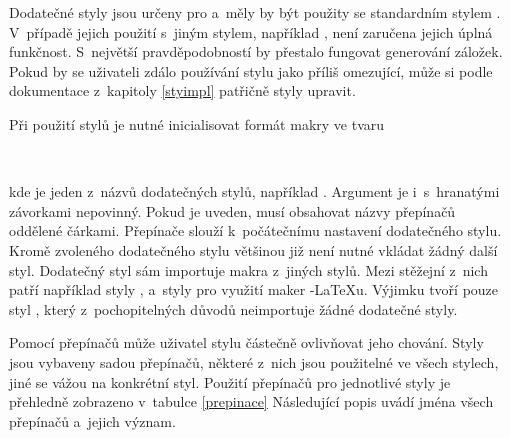 \documentclass[12pt]{article}
\begin{document}
Dodatečné styly jsou určeny pro \LaTeXE{} a~měly by být 
použity se standardním stylem . V~případě jejich použití s~jiným
stylem, například , není zaručena jejich úplná funkčnost. 
S~největší pravděpodobností by přestalo fungovat generování záložek. 
Pokud by se uživateli zdálo používání stylu  jako příliš 
omezující, může si podle dokumentace z~kapitoly \ref{styimpl} patřičně styly
upravit.

\medskip
Při použití stylů je nutné inicialisovat formát makry ve tvaru
\begin{flushleft}
   \\
\end{flushleft}
kde  je jeden z~názvů dodatečných stylů, 
například . Argument  je i~s~hranatými 
závorkami nepovinný. Pokud je uveden, musí obsahovat názvy přepínačů oddělené
čárkami. Přepínače slouží k~počátečnímu nastavení dodatečného stylu. Kromě
zvoleného dodatečného stylu většinou již není nutné vkládat žádný další styl. 
Dodatečný styl sám importuje makra z~jiných stylů.
Mezi stěžejní z~nich patří například styly , 
a~styly pro využití maker \AmS-\LaTeX u. 
Výjimku tvoří pouze styl , 
který z~pochopitelných důvodů neimportuje žádné dodatečné styly.

\medskip
Pomocí přepínačů může uživatel stylu částečně ovlivňovat jeho chování. Styly
jsou vybaveny sadou přepínačů, některé z~nich jsou použitelné ve všech stylech,
jiné se vážou na konkrétní styl.
Použití přepínačů pro jednotlivé styly je přehledně zobrazeno v~tabulce
\ref{prepinace}
Následující popis uvádí jména všech přepínačů a~jejich význam.
\end{document}
